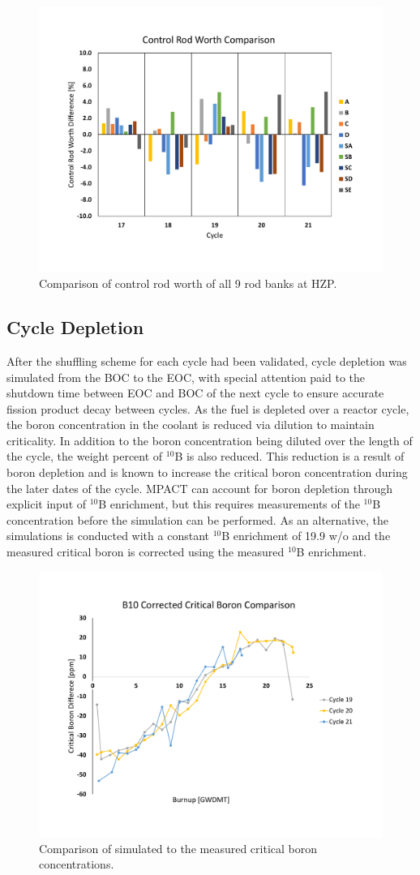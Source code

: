 \documentclass[edeposit,fullpage,11pt]{uiucthesis2009}
\begin{document}
\begin{figure}
\begin{center}
\includegraphics[trim={0 2cm 0 2cm},clip,width=0.5\linewidth]{./Figures/crw_diff.pdf}
\end{center}
\caption{Comparison of control rod worth of all 9 rod banks at HZP.}
\label{fig:crw}
\end{figure} 

\subsection{Cycle Depletion}
After the shuffling scheme for each cycle had been validated, cycle depletion was simulated from the \gls{BOC} to the \gls{EOC}, with special attention paid to the shutdown time between \gls{EOC} and \gls{BOC} of the next cycle to ensure accurate fission product decay between cycles. 
As the fuel is depleted over a reactor cycle, the boron concentration in the coolant is reduced via dilution to maintain criticality. 
In addition to the boron concentration being diluted over the length of the cycle, the weight percent of $^{10}$B is also reduced. 
This reduction is a result of boron depletion and is known to increase the critical boron concentration during the later dates of the cycle. 
MPACT can account for boron depletion through explicit input of $^{10}$B enrichment, but this requires measurements of the $^{10}$B concentration before the simulation can be performed.
As an alternative, the simulations is conducted with a constant $^{10}$B enrichment of 19.9 w/o and the measured critical boron is corrected using the measured $^{10}$B enrichment.
\begin{figure}
\begin{center}
\includegraphics[trim={0 2cm 0 3.1cm},clip,width=0.5\linewidth]{./Figures/corr_b.pdf}
\end{center}
\caption{Comparison of simulated to the measured critical boron concentrations.}
\label{fig:cor_b}
\end{figure} 
\end{document}
